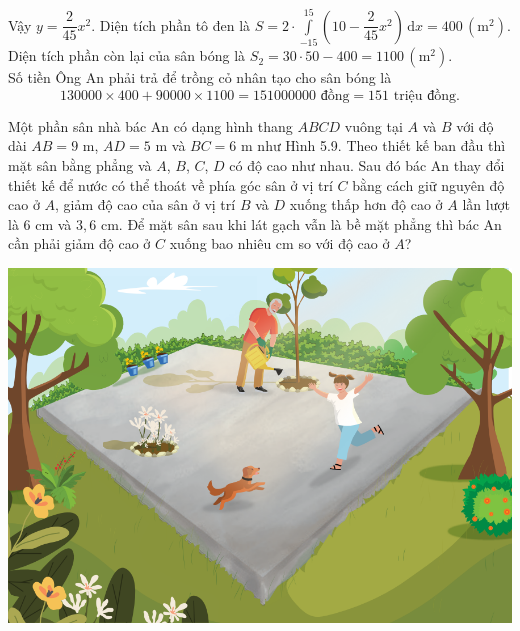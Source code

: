 \begin{ex}
{{}
\noindent
Vậy $y=\dfrac{2}{45}x^2$. Diện tích phần tô đen là $S=2 \cdot \displaystyle\int\limits_{-15}^{15} \left(10-\dfrac{2}{45}x^2 \right) \mathrm{\,d}x=400 \, (\text{m}^2)$.\\
Diện tích phần còn lại của sân bóng là $S_2=30 \cdot 50-400=1100\,(\text{m}^2).$\\
Số tiền Ông An phải trả để trồng cỏ nhân tạo cho sân bóng là
\[130000\times 400+90000\times 1100=151000000\text{ đồng}=151\text{ triệu đồng.}\]}
\end{ex}

\begin{ex}%
Một phần sân nhà bác An có dạng hình thang $ABCD$ vuông tại $A$ và $B$ với độ dài $AB=9$ m, $AD=5$ m và $BC=6$ m như Hình 5.9. Theo thiết kế ban đầu thì mặt sân bằng phẳng và $A$, $B$, $C$, $D$ có độ cao như nhau. Sau đó bác An thay đổi thiết kế để nước có thể thoát về phía góc sân ở vị trí $C$ bằng cách giữ nguyên độ cao ở $A$, giảm độ cao của sân ở vị trí $B$ và $D$ xuống thấp hơn độ cao ở $A$ lần lượt là $6$ cm và $3{,}6$ cm. Để mặt sân sau khi lát gạch vẫn là bề mặt phẳng thì bác An cần phải giảm độ cao ở $C$ xuống bao nhiêu cm so với độ cao ở $A$?
\begin{center}
\includegraphics[scale=.4]{images/2P5-1-H5-9}
\hspace{0.5cm}
\end{center}
\end{ex}
